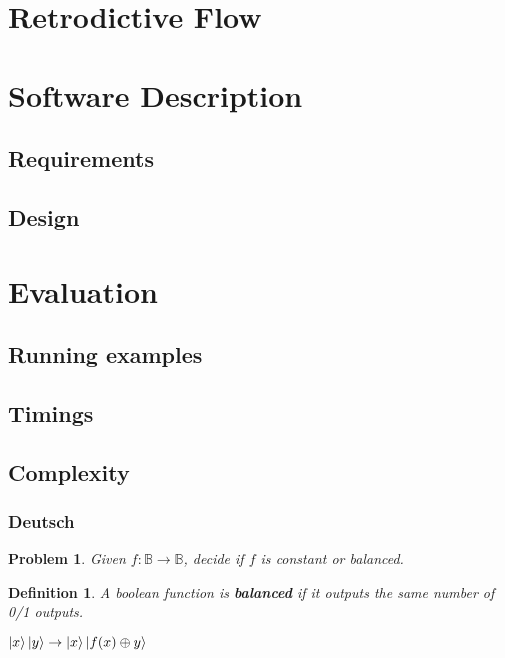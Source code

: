 \documentclass{beamer}
\newcommand{\Bool}{\ensuremath{\mathbb{B}}}
\newtheorem{defn}{Definition}
\newtheorem{prob}{Problem}
\begin{document}

\section[Retrodictive]{Retrodictive Flow}



\section[Software]{Software Description}
\subsection[Requirements]{Requirements}
\subsection[Design]{Design}


\section[Evaluation]{Evaluation}
\subsection[Running]{Running examples}
\subsection[Timings]{Timings}
\subsection[Complexity]{Complexity}

\begin{frame}

\frametitle{Deutsch}

  \begin{prob}
Given $f : \Bool\rightarrow\Bool$, decide if $f$ is 
\emph{constant} or \emph{balanced}.
  \end{prob}

\pause

\begin{defn}
  A boolean function is \textbf{balanced} if it outputs the same number of
  0/1 outputs.
\end{defn}

\pause

\vspace*{1cm}
$\ket{x}\ket{y} \rightarrow\ket{x}\ket{f(x)\oplus y}$
\end{frame}
\end{document}
